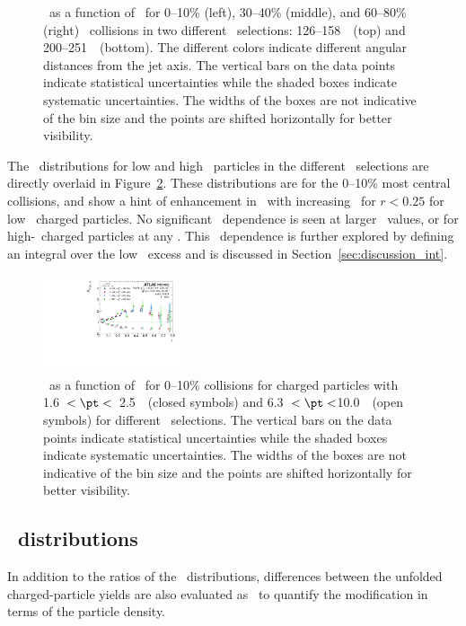 \begin{figure}[h]
{\begin{tabular}{ccc}
\end{tabular}}
\caption{\RDptr\ as a function of \pt\ for  0--10\% (left), 30--40\% (middle), and 60--80\% (right) \PbPb\ collisions in two different \ptjet\ selections: 126--158~\GeV\ (top) and 200--251~\GeV\ (bottom).
The different colors indicate different angular distances from the jet axis.
The vertical bars on the data points indicate statistical uncertainties while the shaded boxes indicate systematic uncertainties.
The widths of the boxes are not indicative of the bin size and the points are shifted horizontally for better visibility.}
\label{fig:pttrkdep}
\end{figure}


The \RDptr\ distributions for low and high \pt\ particles in the different \ptjet\ selections are directly overlaid in Figure~\ref{fig:ptjetdep}.
These distributions are for the 0--10\% most central collisions, and show a hint of enhancement in \RDptr\ with increasing \ptjet\  for $r < 0.25$ for low  \pt\ charged particles.
No significant \ptjet\ dependence is seen at larger \rvar\ values, or for high-\pt\ charged particles at any \rvar.
This \ptjet\ dependence is further explored by defining an integral over the low \pt\ excess and is discussed in Section~\ref{sec:discussion_int}.

\begin{figure}[ht]
\centerline{
\includegraphics[width=0.36\textwidth]{figures/results/RDpT_dR_trk3_trk6_cent0}}
\caption{\RDptr\ as a function of \rvar\ for 0--10\% collisions for charged particles with 1.6~$< \pt <$~2.5~\GeV\ (closed symbols) and 6.3~$< \pt <$10.0~\GeV\ (open symbols) for different \ptjet\ selections.
The vertical bars on the data points indicate statistical uncertainties while the shaded boxes indicate systematic uncertainties.
The widths of the boxes are not indicative of the bin size and the points are shifted horizontally for better visibility.}
\label{fig:ptjetdep}
\end{figure}



\subsection{\DeltaDptr\ distributions}
\label{sec:delta_dptr}
In addition to the ratios of the \Dptr\ distributions, differences between the unfolded charged-particle yields are also evaluated as \DeltaDptr\ to quantify the modification in terms of the particle density.

